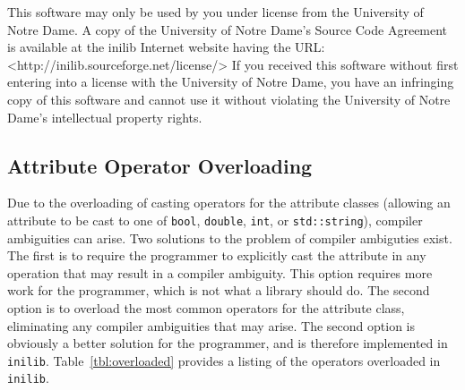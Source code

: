 %
This software may only be used by you under license from the
University of Notre Dame.  A copy of the University of Notre Dame's
Source Code Agreement is available at the inilib Internet website
having the URL: <http://inilib.sourceforge.net/license/> If you
received this software without first entering into a license with the
University of Notre Dame, you have an infringing copy of this software
and cannot use it without violating the University of Notre Dame's
intellectual property rights.
% 
%

\subsection{Attribute Operator Overloading}
\label{sec:op_overload}

Due to the overloading of casting operators for the attribute classes
(allowing an attribute to be cast to one of {\tt bool}, {\tt double},
{\tt int}, or {\tt std::string}), compiler ambiguities can arise.  Two
solutions to the problem of compiler ambiguties exist.  The first is
to require the programmer to explicitly cast the attribute in any
operation that may result in a compiler ambiguity.  This option
requires more work for the programmer, which is not what a library
should do.  The second option is to overload the most common operators
for the attribute class, eliminating any compiler ambiguities that may
arise.  The second option is obviously a better solution for the
programmer, and is therefore implemented in {\tt inilib}.
Table~\ref{tbl:overloaded} provides a listing of the operators
overloaded in {\tt inilib}.

